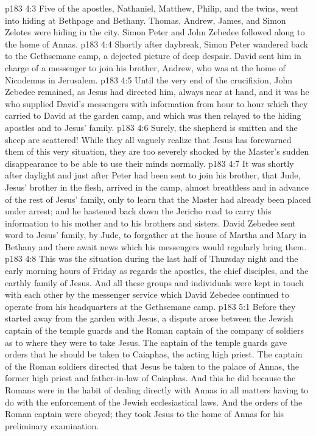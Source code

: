 \vs p183 4:3 Five of the apostles, Nathaniel, Matthew, Philip, and the twins, went into hiding at Bethpage and Bethany. Thomas, Andrew, James, and Simon Zelotes were hiding in the city. Simon Peter and John Zebedee followed along to the home of Annas.
\vs p183 4:4 Shortly after daybreak, Simon Peter wandered back to the Gethsemane camp, a dejected picture of deep despair. David sent him in charge of a messenger to join his brother, Andrew, who was at the home of Nicodemus in Jerusalem.
\vs p183 4:5 Until the very end of the crucifixion, John Zebedee remained, as Jesus had directed him, always near at hand, and it was he who supplied David’s messengers with information from hour to hour which they carried to David at the garden camp, and which was then relayed to the hiding apostles and to Jesus’ family.
\vs p183 4:6 Surely, the shepherd is smitten and the sheep are scattered! While they all vaguely realize that Jesus has forewarned them of this very situation, they are too severely shocked by the Master’s sudden disappearance to be able to use their minds normally.\plusone
\vs p183 4:7 It was shortly after daylight and just after Peter had been sent to join his brother, that Jude, Jesus’ brother in the flesh, arrived in the camp, almost breathless and in advance of the rest of Jesus’ family, only to learn that the Master had already been placed under arrest; and he hastened back down the Jericho road to carry this information to his mother and to his brothers and sisters. David Zebedee sent word to Jesus’ family, by Jude, to forgather at the house of Martha and Mary in Bethany and there await news which his messengers would regularly bring them.
\vs p183 4:8 This was the situation during the last half of Thursday night and the early morning hours of Friday as regards the apostles, the chief disciples, and the earthly family of Jesus. And all these groups and individuals were kept in touch with each other by the messenger service which David Zebedee continued to operate from his headquarters at the Gethsemane camp.
\vs p183 5:1 Before they started away from the garden with Jesus, a dispute arose between the Jewish captain of the temple guards and the Roman captain of the company of soldiers as to where they were to take Jesus. The captain of the temple guards gave orders that he should be taken to Caiaphas, the acting high priest. The captain of the Roman soldiers directed that Jesus be taken to the palace of Annas, the former high priest and father\hyp{}in\hyp{}law of Caiaphas. And this he did because the Romans were in the habit of dealing directly with Annas in all matters having to do with the enforcement of the Jewish ecclesiastical laws. And the orders of the Roman captain were obeyed; they took Jesus to the home of Annas for his preliminary examination.
